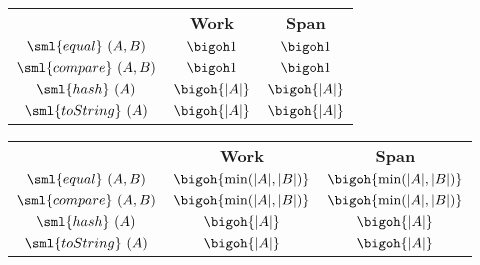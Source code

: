 \begin{cluster}
\label{grp:cst:elt-structures::realelt}

\begin{costspec}[RealElt]
\label{cst:elt-structures::realelt}
\begin{tabular}{c|c|c}
& \textbf{Work} & \textbf{Span} \\
$\sml{equal}~(A,B)$ & $\bigoh 1$ & $\bigoh 1$ \\
$\sml{compare}~(A,B)$ & $\bigoh 1$ & $\bigoh 1$ \\
$\sml{hash}~(A)$ & $\bigoh{|A|}$ & $\bigoh{|A|}$ \\
$\sml{toString}~(A)$ & $\bigoh{|A|}$ & $\bigoh{|A|}$ \\
\end{tabular}

\end{costspec}
\end{cluster}

\begin{cluster}
\label{grp:cost:string}

\begin{costspec}[StringElt]
\label{cost:string}
\begin{tabular}{c|c|c}
& \textbf{Work} & \textbf{Span} \\
$\sml{equal}~(A,B)$ & $\displaystyle \bigoh{\min(|A|, |B|)}$ & $\displaystyle \bigoh {\min(|A|, |B|)}$ \\
$\sml{compare}~(A,B)$ & $\displaystyle \bigoh {\min(|A|, |B|)}$ & $\displaystyle \bigoh {\min(|A|, |B|)}$ \\
$\sml{hash}~(A)$ & $\displaystyle \bigoh {|A|}$ & $\displaystyle \bigoh {|A|}$ \\
$\sml{toString}~(A)$ & $\displaystyle \bigoh {|A|}$ & $\displaystyle \bigoh {|A|}$ \\
\end{tabular}

\end{costspec}
\end{cluster}

